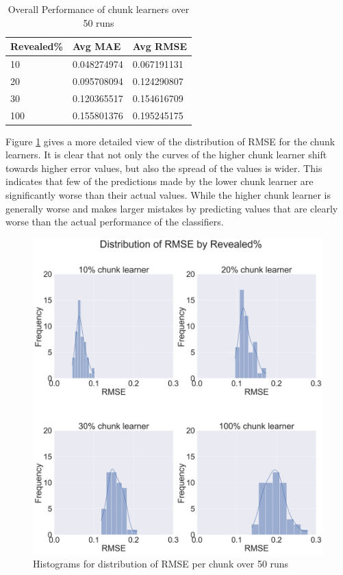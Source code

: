 \begin{table}[hbt!]
    \setlength\extrarowheight{2pt} %
    \begin{tabularx}{\textwidth}{|X|X|X|}
    \hline
    \textbf{Revealed\%} & \textbf{Avg MAE} & \textbf{Avg RMSE} \\ \hline
        10 & 0.048274974 & 0.067191131 \\ \hline
        20 & 0.095708094 & 0.124290807 \\ \hline
        30 & 0.120365517 & 0.154616709 \\ \hline
        100 & 0.155801376 & 0.195245175 \\ \hline
    \end{tabularx}
    \caption{Overall Performance of chunk learners over 50 runs}
    \label{TableOverallErrors}
  \end{table}

Figure \ref{Img:HistogramRMSE} gives a more detailed view of the distribution of RMSE for the chunk learners.
It is clear that not only the curves of the higher chunk learner shift towards higher error values, but also the spread of the values is wider.
This indicates that few of the predictions made by the lower chunk learner are significantly worse than their actual values.
While the higher chunk learner is generally worse and makes larger mistakes by predicting values that are clearly worse than the actual performance of the classifiers.

  \begin{figure}[!htbp]
    \captionsetup{justification=raggedright}
    \centering
    \includegraphics[width=\textwidth]{hist_rmse.jpg}
    \centering
    \caption{Histograms for distribution of RMSE per chunk over 50 runs}
    \label{Img:HistogramRMSE}
  \end{figure}

